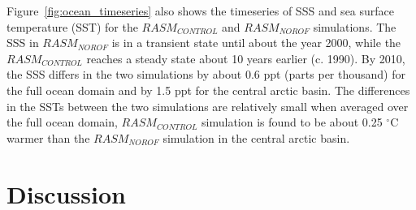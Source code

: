\documentclass[jgrga, draft]{agutex}
\begin{document}
\begin{article}
\begin{itemize}[leftmargin=+.5in]
\begin{itemize}[leftmargin=+.5in]
Figure~\ref{fig:ocean_timeseries} also shows the timeseries of SSS and sea surface temperature (SST) for the $RASM_{CONTROL}$ and $RASM_{NOROF}$ simulations.
The SSS in $RASM_{NOROF}$ is in a transient state until about the year 2000, while the $RASM_{CONTROL}$ reaches a steady state about 10 years earlier (c. 1990).
By 2010, the SSS differs in the two simulations by about 0.6 ppt (parts per thousand) for the full ocean domain and by 1.5 ppt for the central arctic basin.
The differences in the SSTs between the two simulations are relatively small when averaged over the full ocean domain, $RASM_{CONTROL}$ simulation is found to be about 0.25 $^{\circ}$C warmer than the $RASM_{NOROF}$ simulation in the central arctic basin.


\section{Discussion}
\label{sec:discussion}


\end{itemize}
\end{itemize}
\end{article}
\end{document}

